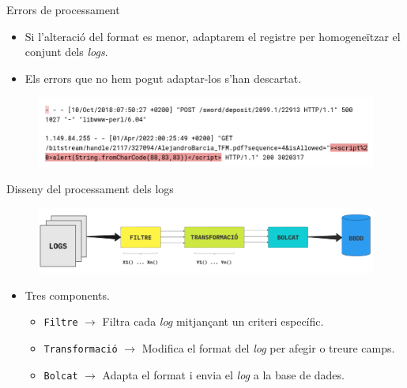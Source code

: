 \begin{frame}{Errors de processament}
    \begin{itemize}%
        \item Si l'alteració del format es menor, adaptarem el registre per homogeneïtzar el conjunt dels \textit{logs}.
        \item Els errors que no hem pogut adaptar-los s'han descartat.
    \end{itemize}
    \begin{figure}[htbp]
        \centerline{\includegraphics[width=\textwidth]{figures/log-error}}
        \label{fig:log-error}
    \end{figure}
\end{frame}

\begin{frame}{Disseny del processament dels logs}

    \begin{figure}
        \includegraphics[width=\textwidth]{figures/log-processing}
        \label{fig:log-processing}
    \end{figure}

    \begin{itemize}%
        \item Tres components.
        \begin{itemize}%
            \item \texttt{Filtre} \(\rightarrow\) Filtra cada \textit{log} mitjançant un criteri específic.
            \item \texttt{Transformació} \(\rightarrow\) Modifica el format del \textit{log} per afegir o treure camps.
            \item \texttt{Bolcat} \(\rightarrow\) Adapta el format i envia el \textit{log} a la base de dades.
        \end{itemize}
    \end{itemize}
\end{frame}


